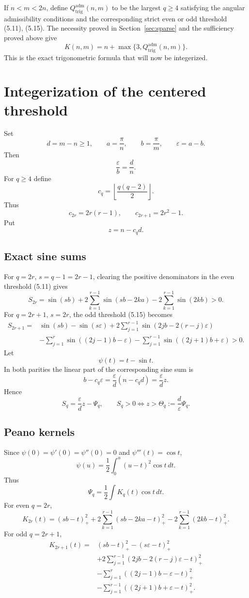 \documentclass[11pt]{article}
\theoremstyle{remark}
\newcommand{\Adm}{Q_{\mathrm{trig}}^{\mathrm{adm}}}
\begin{document}
If $n<m<2n$, define $\Adm(n,m)$ to be the largest $q\ge4$ satisfying the angular admissibility conditions and the corresponding strict even or odd threshold (5.11), (5.15). The necessity proved in Section~\ref{sec:sparse} and the sufficiency proved above give
\[
\boxed{K(n,m)=n+\max\{3,\Adm(n,m)\}.}
\tag{6.9}
\]
This is the exact trigonometric formula that will now be integerized.

\section{Integerization of the centered threshold}\label{sec:integerization}

Set
\[
d=m-n\ge1,
\qquad
a=\frac\pi n,
\qquad b=\frac\pi m,
\qquad\varepsilon=a-b.
\]
Then
\[
\frac{\varepsilon}{b}=\frac dn.
\]
For $q\ge4$ define
\[
\boxed{c_q=\left\lfloor\frac{q(q-2)}2\right\rfloor.}\tag{7.1}
\]
Thus
\[
c_{2r}=2r(r-1),
\qquad
c_{2r+1}=2r^2-1.
\]
Put
\[
z=n-c_qd.
\]

\subsection{Exact sine sums}

For $q=2r$, $s=q-1=2r-1$, clearing the positive denominators in the even threshold (5.11) gives
\[
S_{2r}=\sin(sb)+2\sum_{k=1}^{r-1}\sin(sb-2ka)-2\sum_{k=1}^{r-1}\sin(2kb)>0.\tag{7.2}
\]
For $q=2r+1$, $s=2r$, the odd threshold (5.15) becomes
\[
\begin{aligned}
S_{2r+1}={}&\sin(sb)-\sin(s\varepsilon)
+2\sum_{j=1}^{r-1}\sin(2jb-2(r-j)\varepsilon)\\
&-\sum_{j=1}^{r}\sin((2j-1)b-\varepsilon)
-\sum_{j=1}^{r-1}\sin((2j+1)b+\varepsilon)>0.
\end{aligned}\tag{7.3}
\]
Let
\[
\psi(t)=t-\sin t.
\]
In both parities the linear part of the corresponding sine sum is
\[
b-c_q\varepsilon=\frac{\varepsilon}{d}(n-c_qd)=\frac{\varepsilon}{d}z.
\]
Hence
\[
\boxed{S_q=\frac{\varepsilon}{d}z-\Psi_q,\qquad
S_q>0\iff z>\Theta_q:=\frac d\varepsilon\Psi_q.}\tag{7.4}
\]

\subsection{Peano kernels}

Since $\psi(0)=\psi'(0)=\psi''(0)=0$ and $\psi'''(t)=\cos t$,
\[
\psi(u)=\frac12\int_0^u(u-t)^2\cos t\,dt.
\]
Thus
\[
\Psi_q=\frac12\int K_q(t)\cos t\,dt.
\]
For even $q=2r$,
\[
K_{2r}(t)=(sb-t)_+^2+2\sum_{k=1}^{r-1}(sb-2ka-t)_+^2-2\sum_{k=1}^{r-1}(2kb-t)_+^2.\tag{7.5}
\]
For odd $q=2r+1$,
\[
\begin{aligned}
K_{2r+1}(t)={}&(sb-t)_+^2-(s\varepsilon-t)_+^2\\
&+2\sum_{j=1}^{r-1}(2jb-2(r-j)\varepsilon-t)_+^2\\
&-\sum_{j=1}^{r}((2j-1)b-\varepsilon-t)_+^2\\
&-\sum_{j=1}^{r-1}((2j+1)b+\varepsilon-t)_+^2.
\end{aligned}\tag{7.6}
\]
\end{document}
